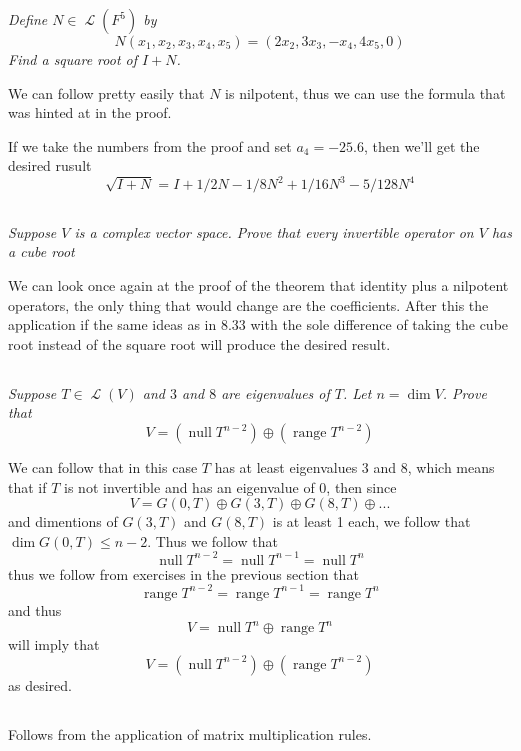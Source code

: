 \documentclass[11pt,oneside,titlepage]{book}
\DeclareMathOperator \map {\mathcal {L}}
\DeclareMathOperator \ns {null}
\DeclareMathOperator \range {range}
\begin{document}
\textit{Define $N \in \map(F^5)$ by
  $$N(x_1, x_2, x_3, x_4, x_5) = (2x_2, 3x_3, -x_4, 4x_5, 0)$$
  Find a square root of $I + N$.}

We can follow pretty easily that $N$ is nilpotent, thus we can use the formula that was hinted
at in the proof.

If we take the numbers from the proof and set $a_4 = -25.6$, then we'll get the desired rusult
$$\sqrt{I + N} = I + 1/2 N - 1/8 N^2 + 1/16 N^3 - 5/128 N^4$$

\subsection{}

\textit{Suppose $V$ is a complex vector space. Prove that every invertible operator
  on $V$ has a cube root}

We can look once again at the proof of the theorem that identity plus a nilpotent operators,
the only thing that would change are the coefficients. After this the application if the
same ideas as in 8.33 with the sole difference of taking the cube root instead of the
square root will produce the desired result.

\subsection{}

\textit{Suppose  $T \in \map(V)$ and $3$ and $8$ are eigenvalues of $T$. Let $n = \dim V$. Prove
  that
  $$V = (\ns T^{n - 2}) \oplus (\range T^{n - 2})$$
}

We can follow that in this case $T$ has at least eigenvalues $3$ and $8$, which means
that if $T$ is not invertible and has an eigenvalue of $0$, then
since
$$V = G(0, T) \oplus G(3, T) \oplus G(8, T) \oplus ... $$
and dimentions  of $G(3, T)$ and $G(8, T)$ is at least 1 each, we follow that
$\dim G(0, T) \leq n - 2$. Thus we follow that
$$\ns T^{n - 2} = \ns T^{n - 1} = \ns T^{n}$$
thus we follow from exercises in the previous section that
$$\range T^{n - 2} = \range T^{n - 1} = \range T^{n}$$
and thus
$$V = \ns T^n \oplus \range T^n$$
will imply that
$$V = (\ns T^{n - 2}) \oplus (\range T^{n - 2})$$
as desired.

\subsection{}

Follows from the application of matrix multiplication rules.
\end{document}
